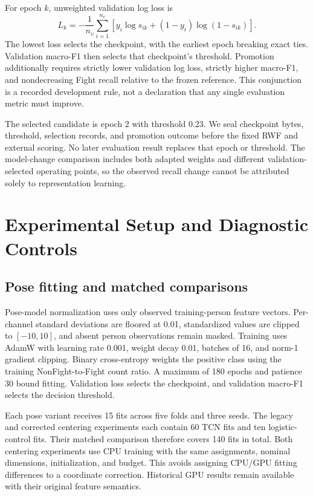 \documentclass[journal]{IEEEtai}
\begin{document}
For epoch $k$, unweighted validation log loss is
\begin{equation}
L_k=-\frac{1}{n_v}\sum_{i=1}^{n_v}
\left[y_i\log s_{ik}+(1-y_i)\log(1-s_{ik})\right].
\end{equation}
The lowest loss selects the checkpoint, with the earliest epoch breaking exact ties. Validation macro-F1 then selects that checkpoint's threshold. Promotion additionally requires strictly lower validation log loss, strictly higher macro-F1, and nondecreasing Fight recall relative to the frozen reference. This conjunction is a recorded development rule, not a declaration that any single evaluation metric must improve.

The selected candidate is epoch 2 with threshold 0.23. We seal checkpoint bytes, threshold, selection records, and promotion outcome before the fixed RWF and external scoring. No later evaluation result replaces that epoch or threshold. The model-change comparison includes both adapted weights and different validation-selected operating points, so the observed recall change cannot be attributed solely to representation learning.



\section{Experimental Setup and Diagnostic Controls}
\subsection{Pose fitting and matched comparisons}
Pose-model normalization uses only observed training-person feature vectors. Per-channel standard deviations are floored at 0.01, standardized values are clipped to $[-10,10]$, and absent person observations remain masked. Training uses AdamW with learning rate 0.001, weight decay 0.01, batches of 16, and norm-1 gradient clipping. Binary cross-entropy weights the positive class using the training NonFight-to-Fight count ratio. A maximum of 180 epochs and patience 30 bound fitting. Validation loss selects the checkpoint, and validation macro-F1 selects the decision threshold.

Each pose variant receives 15 fits across five folds and three seeds. The legacy and corrected centering experiments each contain 60 TCN fits and ten logistic-control fits. Their matched comparison therefore covers 140 fits in total. Both centering experiments use CPU training with the same assignments, nominal dimensions, initialization, and budget. This avoids assigning CPU/GPU fitting differences to a coordinate correction. Historical GPU results remain available with their original feature semantics.
\end{document}
